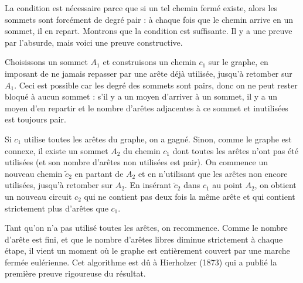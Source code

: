 \begin{Soln}{90}
La condition est nécessaire parce que si un tel chemin fermé existe, alors les sommets sont forcément de degré pair : à chaque fois que le chemin arrive en un sommet, il en repart.
Montrons que la condition est suffisante. Il y a une preuve par l'absurde, mais voici une preuve constructive.

Choisissons un sommet $A_1$ et construisons un chemin $c_1$ sur le graphe, en imposant de ne jamais repasser par une arête déjà utilisée, jusqu'à retomber sur $A_1$. Ceci est possible car les degré des sommets sont pairs, donc on ne peut rester bloqué à aucun sommet : s'il y a un moyen d'arriver à un sommet, il y a un moyen d'en repartir et le nombre d'arêtes adjacentes à ce sommet et inutilisées est toujours pair.

Si $c_1$ utilise toutes les arêtes du graphe, on a gagné. Sinon, comme le graphe est connexe, il existe un sommet $A_2$  du chemin $c_1$ dont toutes les arêtes n'ont pas été utilisées (et son nombre d'arêtes non utilisées est pair). On commence un nouveau chemin $\tilde c_2$ en partant de $A_2$ et en n'utilisant que les arêtes non encore utilisées, jusqu'à retomber sur $A_2$. En insérant $\tilde c_2$ dans $c_1$ au point $A_2$, on obtient un nouveau circuit $c_2$ qui ne contient pas deux fois la même arête et qui contient strictement plus d'arêtes que $c_1$.

Tant qu'on n'a pas utilisé toutes les arêtes, on recommence. Comme le nombre d'arête est fini, et que le nombre d'arêtes libres diminue strictement à chaque étape, il vient un moment où le graphe est entièrement couvert par une marche fermée eulérienne. Cet algorithme est dû à Hierholzer (1873) qui a publié la première preuve rigoureuse du résultat.

%
%


\end{Soln}
